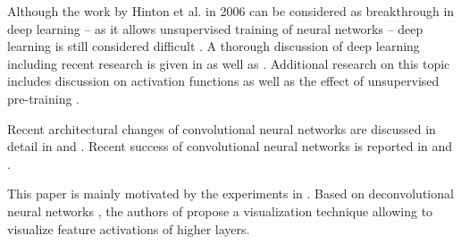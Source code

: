 Although the work by Hinton et al. in 2006 \cite{HintonOsindero:2006} can be considered as breakthrough in deep learning -- as it allows unsupervised training of neural networks -- deep learning is still considered difficult \cite{Bengio:2009}. A thorough discussion of deep learning including recent research is given in \cite{Bengio:2009} as well as \cite{LarochelleBengioLouradourLamblinBottou:2009,GlorotBengio:2010,BengioLeCun:2007}. Additional research on this topic includes discussion on activation functions as well as the effect of unsupervised pre-training \cite{ErhanManzagolBengioVincent:2009,ErhanBengioCourvilleManzagolVincentBengio:2010,GlorotBordesBengio:2011}.

Recent architectural changes of convolutional neural networks are discussed in detail in \cite{JarrettKavukcuogluRanzatoLeCun:2009} and \cite{LeCunKavukvuogluFarabet:2010}. Recent success of convolutional neural networks is reported in \cite{KrizhevskySutskeverHinton:2012} and \cite{CiresanMeierSchmidhuber:2012}.

This paper is mainly motivated by the experiments in \cite{ZeilerFergus:2013}. Based on deconvolutional neural networks \cite{ZeilerKrishnanTaylorFergus:2010}, the authors of \cite{ZeilerFergus:2013} propose a visualization technique allowing to visualize feature activations of higher layers. 